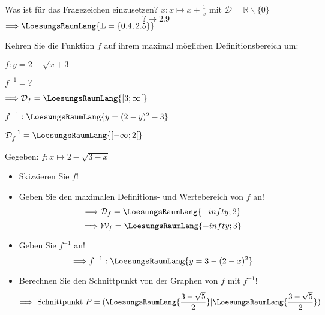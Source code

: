 \begin{bbwAufgabenBlock}
\item Was ist für das Fragezeichen einzusetzen? $x: x \mapsto x+\frac1x$ mit $\mathcal{D}
= \mathbb{R}\backslash \{0\}$
$$? \mapsto 2.9$$
$\Longrightarrow \LoesungsRaumLang{\mathbb{L} = \{0.4, 2.5\}}$

\item Kehren Sie die Funktion $f$ auf ihrem maximal möglichen
Definitionsbereich um:

$f: y=2-\sqrt{x+3}$

$f^{-1} = ?$


$\Longrightarrow \mathcal{D}_f = \LoesungsRaumLang{[3;\infty[}$

$f^{-1}: \LoesungsRaumLang{y = (2-y)^2 - 3}$

$\mathcal{D}_f^{-1} = \LoesungsRaumLang{[-\infty; 2[}$


\item Gegeben: $f: x\mapsto 2-\sqrt{3-x}$

\begin{itemize}
\item Skizzieren Sie $f$!
\item Geben Sie den maximalen Definitions- und Wertebereich von $f$ an!
  $$\Longrightarrow \mathcal{D}_f = \LoesungsRaumLang{-infty;2}$$
  $$\Longrightarrow \mathcal{W}_f = \LoesungsRaumLang{-infty;3}$$
\item Geben Sie $f^{-1}$ an!
  $$\Longrightarrow f^{-1}: \LoesungsRaumLang{y=3-(2-x)^2}$$
\item Berechnen Sie den Schnittpunkt von der Graphen von $f$ mit
$f^{-1}$!
  $$\Longrightarrow \textrm{ Schnittpunkt } P=(\LoesungsRaumLang{\frac{3-\sqrt{5}}2}|\LoesungsRaumLang{\frac{3-\sqrt{5}}2})$$

\end{itemize}
\end{bbwAufgabenBlock}

\platzFuerBerechnungenBisEndeSeite{}


\platzFuerBerechnungenBisEndeSeite{}



